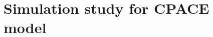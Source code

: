
\chapter{Simulation study for  CPACE model \label{cha:real_application}}  %

\ifpdf
    \graphicspath{{Chapter7/Figs/Raster/}{Chapter7/Figs/PDF/}{Chapter7/Figs/}}
\else
    \graphicspath{{Chapter7/Figs/Vector/}{Chapter7/Figs/}}
\fi
